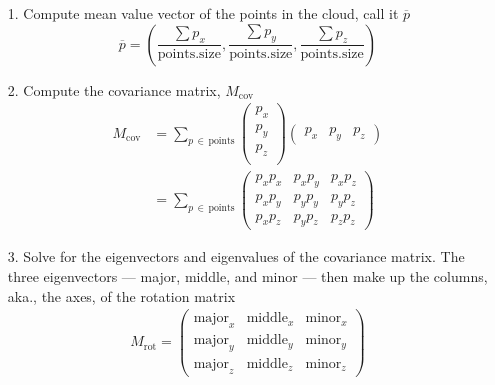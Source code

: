\documentclass[journal]{IEEEtran}
\begin{document}
 \begin{enumerate}
	\item[1.] Compute mean value vector of the points in the cloud, call it $\overline{p}$
\begin{equation}
\overline{p} =\left(\frac{\sum p_x}{\text{points.size}}, \frac{\sum p_y}{\text{points.size}},\frac{\sum p_z}{\text{points.size}}\right)
\end{equation}
\item[2.] Compute the covariance matrix, $M_{\text{cov}}$
\begin{align}
M_{\text{cov}} &= \sum_{p \, \in \, \text{points}} 
	\left(
\begin{array}{c}
p_x\\
p_y\\
p_z\\
\end{array}
\right)
\left(
\begin{matrix}
p_x & p_y & p_z	
\end{matrix}
\right)\\ &= \sum_{p \, \in \, \text{points}}
\left(
\begin{matrix}
	p_x p_x & p_x p_y & p_x p_z \\
	p_x p_y & p_y p_y & p_y p_z \\
	p_x p_z & p_y p_z & p_z p_z
\end{matrix}
\right)
\end{align}
\item[3.] Solve for the eigenvectors and eigenvalues of the covariance matrix.  The three eigenvectors --- major, middle, and minor --- then make up the columns, aka., the axes, of the rotation matrix
\begin{align}
	M_\text{rot} = 
	\left(
	\begin{matrix}
		\text{major}_x & \text{middle}_x & \text{minor}_x\\
		\text{major}_y & \text{middle}_y & \text{minor}_y\\
		\text{major}_z & \text{middle}_z & \text{minor}_z
	\end{matrix}
	\right)
\end{align}

\end{enumerate}
\end{document}
